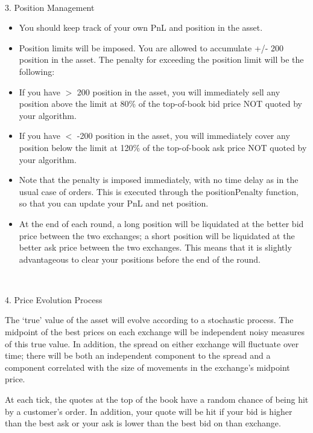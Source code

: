 \documentclass[12pt]{article}
\begin{document}
\ \\
\begin{center}3. Position Management\end{center}
\begin{itemize}
  \item You should keep track of your own PnL and position in the asset.
  \item Position limits will be imposed. You are allowed to accumulate +/- 200 position in the asset. The penalty for exceeding the position limit will be the following:
  \item If you have $>$ 200 position in the asset, you will immediately sell any position above the limit at 80\% of the top-of-book bid price NOT quoted by your algorithm.
  \item If you have $<$ -200 position in the asset, you will immediately cover any position below the limit at 120\% of the top-of-book ask price NOT quoted by your algorithm.
  \item Note that the penalty is imposed immediately, with no time delay as in the usual case of orders. This is executed through the positionPenalty function, so that you can update your PnL and net position.
  \item At the end of each round, a long position will be liquidated at the better bid price between the two exchanges; a short position will be liquidated at the better ask price between the two exchanges. This means that it is slightly advantageous to clear your positions before the end of the round.
\end{itemize}

\ \\
\begin{center}4. Price Evolution Process\end{center}
The ‘true’ value of the asset will evolve according to a stochastic process. The midpoint of the best prices on each exchange will be independent noisy measures of this true value. In addition, the spread on either exchange will fluctuate over time; there will be both an independent component to the spread and a component correlated with the size of movements in the exchange’s midpoint price.

At each tick, the quotes at the top of the book have a random chance of being hit by a customer’s order. In addition, your quote will be hit if your bid is higher than the best ask or your ask is lower than the best bid on than exchange.
\end{document}
